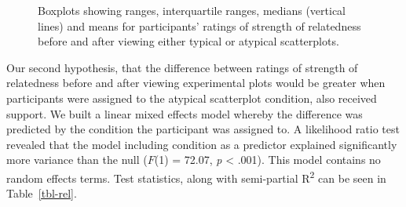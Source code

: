 \documentclass[manuscript,screen,review,anonymous]{acmart}
\begin{document}
\begin{figure}


\caption{\label{fig-abso-descriptives}Boxplots showing ranges,
interquartile ranges, medians (vertical lines) and means for
participants' ratings of strength of relatedness before and after
viewing either typical or atypical scatterplots.}

\end{figure}%

Our second hypothesis, that the difference between ratings of strength
of relatedness before and after viewing experimental plots would be
greater when participants were assigned to the atypical scatterplot
condition, also received support. We built a linear mixed effects model
whereby the difference was predicted by the condition the participant
was assigned to. A likelihood ratio test revealed that the model
including condition as a predictor explained significantly more variance
than the null (\(F\)(1) = 72.07, \emph{p} \textless{} .001). This model
contains no random effects terms. Test statistics, along with
semi-partial R\textsuperscript{2} can be seen in Table~\ref{tbl-rel}.

\begin{table}

\caption{\label{tbl-rel}Statistics for the significant main effect of
condition on the difference between pre and post scatterplot viewing
ratings for typical and atypical plots. Semi-partial
R\textsuperscript{2} is also incuded.}


\end{table}%
\end{document}
